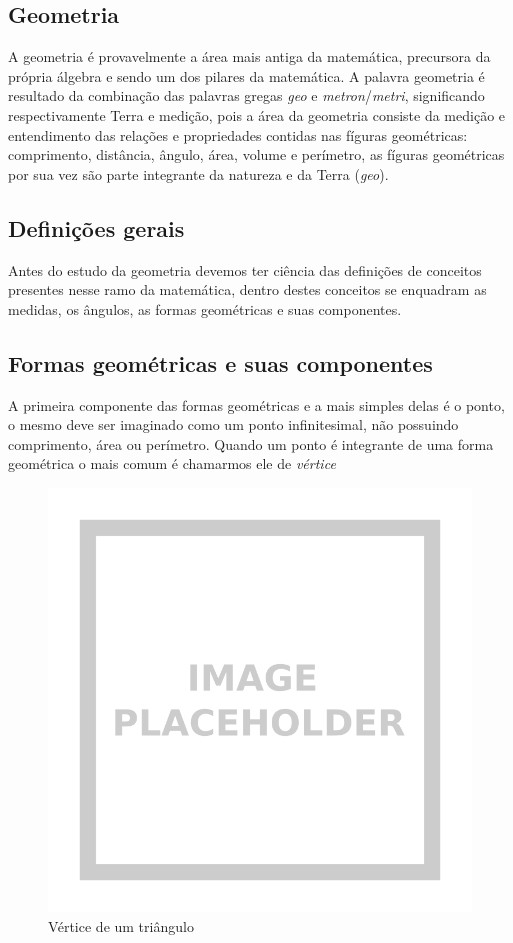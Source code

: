 \renewcommand{\sectionauthor}{Prof. Gustavo Ale}

\begin{multicols*}{2}
        
    \section*{Geometria}
    A geometria é provavelmente a área mais antiga da matemática, precursora da própria álgebra e sendo um dos pilares 
    da matemática. A palavra geometria é resultado da combinação das palavras gregas \textit{geo} e 
    \textit{metron}/\textit{metri}, significando respectivamente Terra e medição, pois a área da geometria consiste da
    medição e entendimento das relações e propriedades  contidas nas fíguras geométricas: comprimento, distância, ângulo, 
    área, volume e perímetro, as fíguras geométricas por sua vez são parte integrante da natureza e da Terra (\textit{geo}).
    
    \subsection*{Definições gerais}
    Antes do estudo da geometria devemos ter ciência das definições de conceitos presentes nesse ramo da matemática, 
    dentro destes conceitos se enquadram as medidas, os ângulos, as formas geométricas e suas componentes.  
    
    \subsection*{Formas geométricas e suas componentes}
    A primeira componente das formas geométricas e a mais simples delas é o ponto, o mesmo deve ser imaginado como um 
    ponto infinitesimal, não possuindo comprimento, área ou perímetro. Quando um ponto é integrante de uma forma 
    geométrica o mais comum é chamarmos ele de \textit{vértice}

    \begin{figure}[H]
        \centering
        \includegraphics[width=0.7\columnwidth]{assets/image_placeholder.png}
        \caption{Vértice de um triângulo }
    \end{figure}


\end{multicols*}
